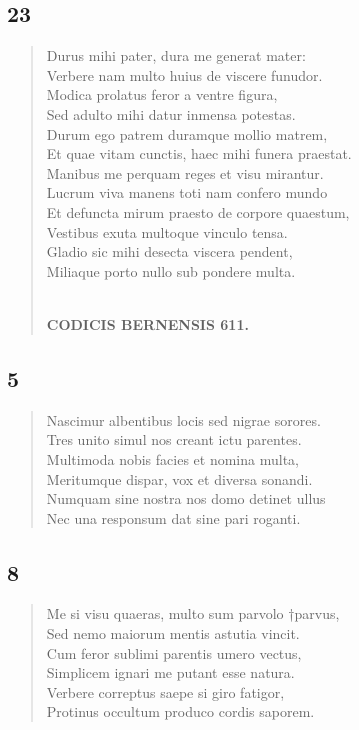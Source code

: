 \documentclass[11pt, a4paper]{report}
\begin{document}
            \subsection*{23}
      \begin{verse}
      Durus mihi pater, dura me generat mater: \\ Verbere nam multo huius de viscere funudor. \\ Modica prolatus feror a ventre figura, \\ Sed adulto mihi datur inmensa potestas. \\ Durum ego patrem duramque mollio matrem, \\ Et quae vitam cunctis, haec mihi funera praestat. \\ Manibus me perquam reges et visu mirantur. \\ Lucrum viva manens toti nam confero mundo \\ Et defuncta mirum praesto de corpore quaestum, \\ Vestibus exuta multoque vinculo tensa. \\ Gladio sic mihi desecta viscera pendent, \\ Miliaque porto nullo sub pondere multa. \\ 
        ﻿\pagebreak 
    \begin{center} \textbf{CODICIS BERNENSIS 611.} \end{center} \marginpar{[359]} 
      \end{verse}
  
            \subsection*{5}
      \begin{verse}
      Nascimur albentibus locis sed nigrae sorores. \\ Tres unito simul nos creant ictu parentes. \\ Multimoda nobis facies et nomina multa, \\ Meritumque dispar, vox et diversa sonandi. \\ Numquam sine nostra nos domo detinet ullus \\ Nec una responsum dat sine pari roganti. \\ 
      \end{verse}
  
            \subsection*{8}
      \begin{verse}
      Me si visu quaeras, multo sum parvolo †parvus, \\ Sed nemo maiorum mentis astutia vincit. \\ Cum feror sublimi parentis umero vectus, \\ Simplicem ignari me putant esse natura. \\ Verbere correptus saepe si giro fatigor, \\ Protinus occultum produco cordis saporem. \\ 
      \end{verse}
  
\end{document}
